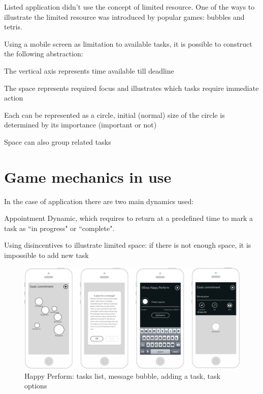 Listed application didn't use the concept of limited resource. One of the ways to illustrate the limited resource was introduced by popular games: bubbles and tetris.

Using a mobile screen as limitation to available tasks, it is possible to construct the following abstraction:

\begin{compactitem}
\item The vertical axis represents time available till deadline
\item The space represents required focus and illustrates which tasks require immediate action
\item Each can be represented as a circle, initial (normal) size of the circle is determined by its importance (important or not)
\item Space can also group related tasks
\end{compactitem}

\section{Game mechanics in use}

In the case of application there are two main dynamics used:

\begin{compactenum}
\item Appointment Dynamic, which requires to return at a predefined time to mark a task as ``in progress" or ``complete".\item Using disincentives to illustrate limited space: if there is not enough space, it is impossible to add new task
\end{compactenum}

\begin{figure}
   \centering
	\includegraphics[width=1\linewidth]{resources/other-screens.pdf}
	\caption[Happy Perform, other screens]{Happy Perform: tasks list, message bubble, adding a task, task options}
\end{figure}

